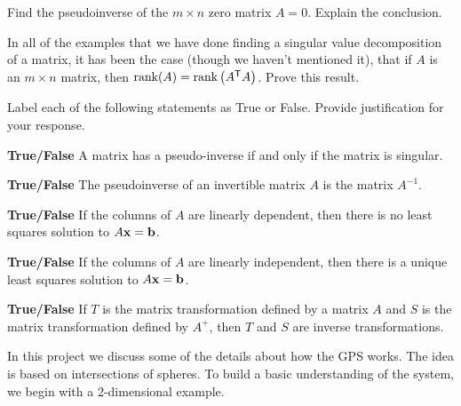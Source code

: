 	\ea
	
\item Find the pseudoinverse of the $m \times n$ zero matrix $A=0$. Explain the conclusion.

\item In all of the examples that we have done finding a singular value decomposition of a matrix, it has been the case (though we haven't mentioned it), that if $A$ is an $m \times n$ matrix, then $\text{rank}(A) = \text{rank}\left(A^{\mathsf{T}}A\right)$. Prove this result.

	
\item Label each of the following statements as True or False. Provide justification for your response.
	\ba
	\item \textbf{True/False} A matrix has a pseudo-inverse if and only if the matrix is singular. 
	\item \textbf{True/False} The pseudoinverse of an invertible matrix $A$ is the matrix $A^{-1}$. 
	\item \textbf{True/False} If the columns of $A$ are linearly dependent, then there is no least squares solution to $A\mathbf{x} = \mathbf{b}$. 
	\item \textbf{True/False} If the columns of $A$ are linearly independent, then there is a unique least squares solution to $A\mathbf{x} = \mathbf{b}$.
	\item \textbf{True/False} If $T$ is the matrix transformation defined by a matrix $A$ and $S$ is the matrix transformation defined by $A^{+}$, then $T$ and $S$ are inverse transformations. 
	\ea


\ee


In this project we discuss some of the details about how the GPS works. The idea is based on intersections of spheres. To build a basic understanding of the system, we begin with a 2-dimensional example. 

